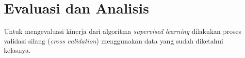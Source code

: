 %
%
%
%

\section{Evaluasi dan Analisis}

Untuk mengevaluasi kinerja dari algoritma \textit{supervised learning} dilakukan proses validasi silang (\textit{cross validation}) menggunakan data yang sudah diketahui kelasnya.